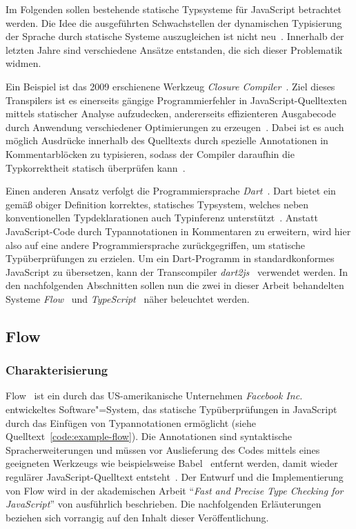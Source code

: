 Im Folgenden sollen bestehende statische Typsysteme für JavaScript betrachtet werden. Die Idee die ausgeführten Schwachstellen der dynamischen Typisierung der Sprache durch statische Systeme auszugleichen ist nicht neu~\autocite[2]{FLOW:PAPER}. Innerhalb der letzten Jahre sind verschiedene Ansätze entstanden, die sich dieser Problematik widmen.

Ein Beispiel ist das 2009 erschienene Werkzeug \textit{Closure Compiler}~\autocite{CLOSURE:COMPILER}. Ziel dieses Transpilers ist es einerseits gängige Programmierfehler in JavaScript-Quelltexten mittels statischer Analyse aufzudecken, andererseits effizienteren Ausgabecode durch Anwendung verschiedener Optimierungen zu erzeugen~\autocite{CLOSURE:COMPILER}. Dabei ist es auch möglich Ausdrücke innerhalb des Quelltexts durch spezielle Annotationen in Kommentarblöcken zu typisieren, sodass der Compiler daraufhin die Typkorrektheit statisch überprüfen kann~\autocite{CLOSURE:TYPES}.

Einen anderen Ansatz verfolgt die Programmiersprache \textit{Dart}~\autocite{DART:SPEC}. Dart bietet ein gemäß obiger Definition korrektes, statisches Typsystem, welches neben konventionellen Typdeklarationen auch Typinferenz unterstützt~\autocite{DART:TYPE_SYSTEM}. Anstatt JavaScript-Code durch Typannotationen in Kommentaren zu erweitern, wird hier also auf eine andere Programmiersprache zurückgegriffen, um statische Typüberprüfungen zu erzielen. Um ein Dart-Programm in standardkonformes JavaScript zu übersetzen, kann der Transcompiler \textit{dart2js}~\autocite{DART:DART2JS} verwendet werden. In den nachfolgenden Abschnitten sollen nun die zwei in dieser Arbeit behandelten Systeme \textit{Flow}~\autocite{FLOW:PAPER} und \textit{TypeScript}~\autocite{TYPESCRIPT:SPEC} näher beleuchtet werden.

\subsection{Flow}
\label{subsec:flow}

\subsubsection{Charakterisierung}

Flow~\autocite{FLOW:PAPER} ist ein durch das US-amerikanische Unternehmen \textit{Facebook Inc.} entwickeltes Software"=System, das statische Typüberprüfungen in JavaScript durch das Einfügen von Typannotationen ermöglicht (siehe Quelltext~\ref{code:example-flow}). Die Annotationen sind syntaktische Spracherweiterungen und müssen vor Auslieferung des Codes mittels eines geeigneten Werkzeugs wie beispielsweise Babel~\autocite{BABEL} entfernt werden, damit wieder regulärer JavaScript-Quelltext entsteht~\autocite{FLOW:INSTALLATION}.
Der Entwurf und die Implementierung von Flow wird in der akademischen Arbeit \enquote{\textit{Fast and Precise Type Checking for JavaScript}} von \citeauthor{FLOW:PAPER} ausführlich beschrieben. Die nachfolgenden Erläuterungen beziehen sich vorrangig auf den Inhalt dieser Veröffentlichung.

